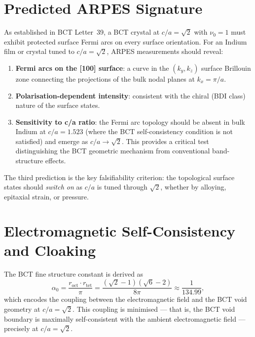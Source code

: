 \documentclass[aps,prl,twocolumn,superscriptaddress,floatfix]{revtex4-2}
\begin{document}
\section{Predicted ARPES Signature}

As established in BCT Letter~39, a BCT crystal at $c/a = \sqrt{2}$
with $\nu_0 = 1$ must exhibit protected surface Fermi arcs on every
surface orientation.
For an Indium film or crystal tuned to $c/a = \sqrt{2}$, ARPES
measurements should reveal:

\begin{enumerate}
  \item \textbf{Fermi arcs on the [100] surface}: a curve in the
        $(k_y, k_z)$ surface Brillouin zone connecting the projections
        of the bulk nodal planes at $k_x = \pi/a$.
  \item \textbf{Polarisation-dependent intensity}: consistent with the
        chiral (BDI class) nature of the surface states.
  \item \textbf{Sensitivity to c/a ratio}: the Fermi arc topology should
        be absent in bulk Indium at $c/a = 1.523$ (where the BCT
        self-consistency condition is not satisfied) and emerge as
        $c/a \to \sqrt{2}$.
        This provides a critical test distinguishing the BCT geometric
        mechanism from conventional band-structure effects.
\end{enumerate}

The third prediction is the key falsifiability criterion:
the topological surface states should \emph{switch on} as $c/a$
is tuned through $\sqrt{2}$, whether by alloying, epitaxial strain,
or pressure.

\section{Electromagnetic Self-Consistency and Cloaking}

The BCT fine structure constant is derived as
\begin{equation}
  \alpha_0 = \frac{r_{\mathrm{oct}} \cdot r_{\mathrm{tet}}}{\pi}
  = \frac{(\sqrt{2}-1)(\sqrt{6}-2)}{8\pi} \approx \frac{1}{134.99},
\end{equation}
which encodes the coupling between the electromagnetic field and the
BCT void geometry at $c/a = \sqrt{2}$.
This coupling is minimised --- that is, the BCT void boundary is
maximally self-consistent with the ambient electromagnetic field ---
precisely at $c/a = \sqrt{2}$.
\end{document}
